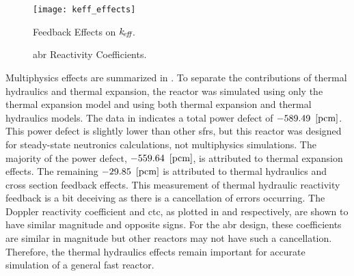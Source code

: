   \begin{figure}
    \centering
    \texttt{[image: keff\_effects]}
    \caption{Feedback Effects on $k_{\!\mbox{\scriptsize \em eff}}$.}
    \label{fig:keff_effects}
  \end{figure}

  \begin{figure}
    \centering
    \hspace*{\fill}
    \vspace{\baselineskip}
    \hspace*{\fill}
    \caption{\gls{abr} Reactivity Coefficients.}
    \label{fig:abr_reactivity_coefficients}
  \end{figure}

  Multiphysics effects are summarized in . To
  separate the contributions of thermal hydraulics and thermal expansion, the
  reactor was simulated using only the thermal expansion model and using both
  thermal expansion and thermal hydraulics models.  The data in
   indicates a total power defect of
  $-589.49~\left[\text{{pcm}}\right]$.  This power defect is slightly lower than other
  \glspl{sfr}, but this reactor was designed for steady-state neutronics
  calculations, not multiphysics simulations. The majority of the power defect,
  $-559.64~\left[\text{{pcm}}\right]$, is attributed to thermal expansion effects.
  The remaining $-29.85~\left[\text{{pcm}}\right]$ is attributed to thermal hydraulics and 
  cross section feedback effects. This measurement of thermal hydraulic
  reactivity feedback is a bit deceiving as there is a cancellation of errors
  occurring. The Doppler reactivity coefficient and \gls{ctc}, as plotted in
   and
   respectively, are shown
  to have similar magnitude and opposite signs. For the \gls{abr} design, these
  coefficients are similar in magnitude but other reactors may not have such a
  cancellation. Therefore, the thermal hydraulics effects remain important for
  accurate simulation of a general fast reactor.

